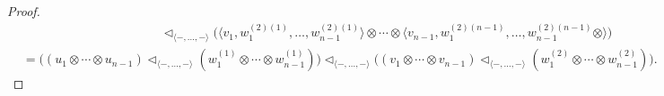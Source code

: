 \documentclass[a4paper,reqno,10pt]{amsart}
\theoremstyle{plain}
\theoremstyle{definition}
\theoremstyle{remark}
\begin{document}
\begin{proof}
\begin{align*}
  & \qquad \qquad \quad \qquad \qquad \qquad \triangleleft_{\langle -, \ldots , - \rangle }   \big(  \langle v_1, w_1^{(2) (1)}, \ldots, w_{n-1}^{(2) (1)} \rangle \otimes \cdots \otimes  \langle v_{n-1}, w_1^{ (2)(n-1)} , \ldots, w_{n-1}^{ (2)(n-1)} \otimes  \rangle  \big) \\
  &= \big(  {\scriptstyle  (u_1 \otimes \cdots \otimes u_{n-1})} \triangleleft_{\langle -, \ldots , - \rangle } {\scriptstyle  (w_1^{(1)} \otimes \cdots \otimes w_{n-1}^{(1)})}   \big) \triangleleft_{\langle -, \ldots , - \rangle } \big( {\scriptstyle  (v_1 \otimes \cdots \otimes v_{n-1})} \triangleleft_{\langle -, \ldots , - \rangle } {\scriptstyle (w_1^{(2)} \otimes \cdots \otimes w_{n-1}^{(2)})}    \big).
   \end{align*}

   \medskip


\end{proof}
\end{document}
